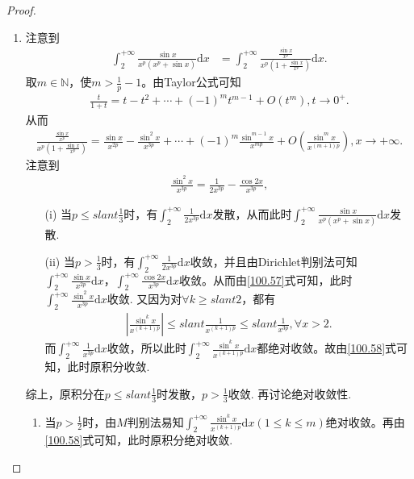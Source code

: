 \documentclass[../../main.tex]{subfiles}
\begin{document}
\begin{proof}
\begin{enumerate}
\item 注意到
\begin{align*}
\int_{2}^{+\infty}\frac{\sin x}{x^p(x^p + \sin x)}\mathrm{d}x&=\int_{2}^{+\infty}\frac{\frac{\sin x}{x^p}}{x^p(1 + \frac{\sin x}{x^p})}\mathrm{d}x.
\end{align*}
取\(m\in \mathbb{N}\)，使\(m > \frac{1}{p}-1\)。由Taylor公式可知
\begin{align*}
\frac{t}{1 + t}=t - t^2+\cdots + (-1)^mt^{m - 1}+O(t^m),t\rightarrow 0^+.
\end{align*}
从而
\begin{align}
\frac{\frac{\sin x}{x^p}}{x^p(1 + \frac{\sin x}{x^p})}=\frac{\sin x}{x^{2p}}-\frac{\sin^2 x}{x^{3p}}+\cdots + (-1)^m\frac{\sin^{m - 1} x}{x^{mp}}+O\left(\frac{\sin^m x}{x^{(m + 1)p}}\right),x\rightarrow +\infty. \label{100.58}
\end{align}
注意到
\begin{align}
\frac{\sin^2 x}{x^{3p}}=\frac{1}{2x^{3p}}-\frac{\cos 2x}{x^{3p}}, \label{100.57}
\end{align}
\begin{enumerate}
\item[(i)] 当\(p\leqslant slant \frac{1}{3}\)时，有\(\int_{2}^{+\infty}\frac{1}{2x^{3p}}\mathrm{d}x\)发散，从而此时\(\int_{2}^{+\infty}\frac{\sin x}{x^p(x^p + \sin x)}\mathrm{d}x\)发散.
\item[(ii)] 当\(p > \frac{1}{3}\)时，有\(\int_{2}^{+\infty}\frac{1}{2x^{3p}}\mathrm{d}x\)收敛，并且由Dirichlet判别法可知\(\int_{2}^{+\infty}\frac{\sin x}{x^{2p}}\mathrm{d}x\)，\(\int_{2}^{+\infty}\frac{\cos 2x}{x^{3p}}\mathrm{d}x\)收敛。从而由\eqref{100.57}式可知，此时\(\int_{2}^{+\infty}\frac{\sin^2 x}{x^{3p}}\mathrm{d}x\)收敛.
又因为对\(\forall k\geqslant slant 2\)，都有
\begin{align*}
\left|\frac{\sin^k x}{x^{(k + 1)p}}\right|\leqslant slant\frac{1}{x^{(k + 1)p}}\leqslant slant\frac{1}{x^{3p}},\forall x > 2.
\end{align*}
而\(\int_{2}^{+\infty}\frac{1}{x^{3p}}\mathrm{d}x\)收敛，所以此时\(\int_{2}^{+\infty}\frac{\sin^k x}{x^{(k + 1)p}}\mathrm{d}x\)都绝对收敛。故由\eqref{100.58}式可知，此时原积分收敛.
\end{enumerate}
综上，原积分在\(p\leqslant slant \frac{1}{3}\)时发散，\(p > \frac{1}{3}\)收敛.
再讨论绝对收敛性.
\begin{enumerate}
\item 当\(p > \frac{1}{2}\)时，由$M$判别法易知\(\int_{2}^{+\infty}\frac{\sin^k x}{x^{(k + 1)p}}\mathrm{d}x(1\leqslant  k\leqslant  m)\)绝对收敛。再由\eqref{100.58}式可知，此时原积分绝对收敛.

\end{enumerate}
\end{enumerate}
\end{proof}
\end{document}
